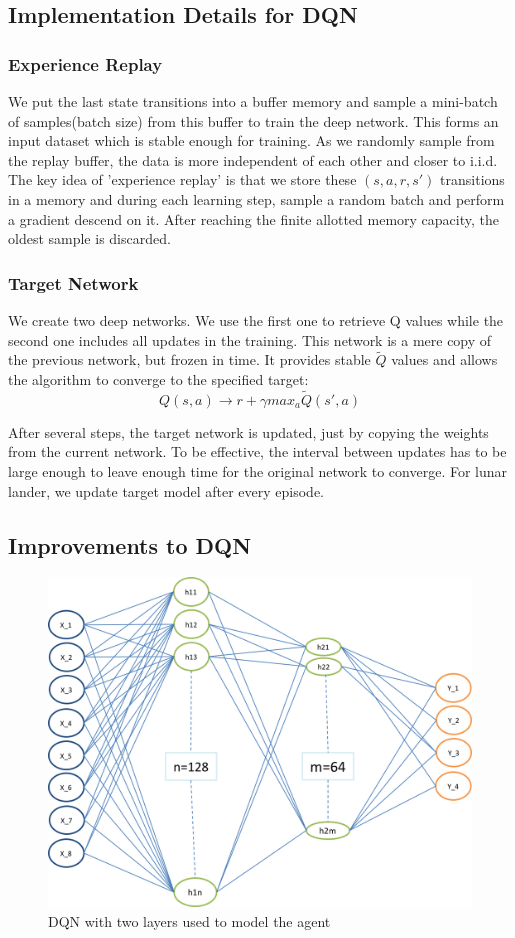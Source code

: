 \subsection{Implementation Details for DQN}

\subsubsection{Experience Replay}
We put the last state transitions into a buffer memory and sample a mini-batch of samples(batch size)  from this buffer to train the deep network. This forms an input dataset which is stable enough for training. As we randomly sample from the replay buffer, the data is more independent of each other and closer to i.i.d. 
\newline
The key idea of 'experience replay' is that we store these $(s, a, r, s')$ transitions in a memory and during each learning step, sample a random batch and perform a gradient descend on it. 
After reaching the finite allotted memory capacity, the oldest sample is discarded.
\newline

\subsubsection{Target Network}
We create two deep networks. We use the first one to retrieve Q values while the second one includes all updates in the training. This network is a mere copy of the previous network, but frozen in time. It provides stable $\tilde{Q}$ values and allows the algorithm to converge to the specified target:
\begin{equation}
Q(s, a) \xrightarrow{} r + \gamma max_a \tilde{Q}(s', a)
\end{equation}

After several steps, the target network is updated, just by copying the weights from the current network. To be effective, the interval between updates has to be large enough to leave enough time for the original network to converge. \newline
For lunar lander, we update target model after every episode.

\subsection{Improvements to DQN}



\begin{figure}[!ht]
\centering
\includegraphics[scale=0.35,width=0.35\columnwidth]{figures/NN.png}%
\caption{ DQN with two layers used to model the agent}%
\label{fig:Visualization}%
\end{figure}

